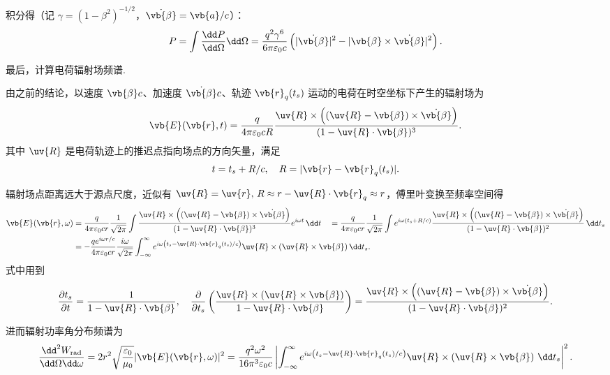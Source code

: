 积分得（记 \(\gamma = (1 - \beta^2)^{-1/2}\)，\(\dot{\vb{\beta}} = \vb{a}/c\)）：
\begin{align*}
	P = \int \dfrac{\dd P}{\dd \Omega} \dd \Omega = \dfrac{q^2 \gamma^6}{6\pi \varepsilon_0 c} \left( |\dot{\vb{\beta}}|^2 - |\vb{\beta} \times \dot{\vb{\beta}}|^2 \right).
\end{align*}

最后，计算电荷辐射场频谱.

由之前的结论，以速度 \(\vb{\beta}c\)、加速度 \(\dot{\vb{\beta}}c\)、轨迹 \(\vb{r}_{q}(t_{s})\) 运动的电荷在时空坐标下产生的辐射场为
\begin{align*}
	\vb{E}(\vb{r}, t) = \frac{q}{4\pi \varepsilon_{0} c R} \frac{\uv{R} \times \left( (\uv{R} - \vb{\beta}) \times \dot{\vb{\beta}} \right)}{(1 - \uv{R} \cdot \vb{\beta})^{3}}.
\end{align*}
其中 \(\uv{R}\) 是电荷轨迹上的推迟点指向场点的方向矢量，满足
\begin{align*}
	t = t_{s} + R/c, \quad R = |\vb{r} - \vb{r}_{q}(t_{s})|.
\end{align*}

辐射场点距离远大于源点尺度，近似有 \(\uv{R}=\uv{r},\,R \approx r - \uv{R} \cdot \vb{r}_{q} \approx r\)，傅里叶变换至频率空间得
\begin{align*}
	\vb{E}(\vb{r}, \omega) &= \frac{q}{4\pi \varepsilon_{0} c r} \frac{1}{\sqrt{2\pi}} \int \frac{\uv{R} \times \left( (\uv{R} - \vb{\beta}) \times \dot{\vb{\beta}} \right)}{(1 - \uv{R} \cdot \vb{\beta})^{3}} e^{i\omega t} \, \dd t \quad= \frac{q}{4\pi \varepsilon_{0} c r} \frac{1}{\sqrt{2\pi}} \int e^{i\omega (t_{s} + R/c)} \frac{\uv{R} \times \left( (\uv{R} - \vb{\beta}) \times \dot{\vb{\beta}} \right)}{(1 - \uv{R} \cdot \vb{\beta})^{2}} \, \dd t_{s} \\
	&= -\frac{q e^{i\omega r/c}}{4\pi \varepsilon_{0} c r} \frac{i\omega}{\sqrt{2\pi}} \int_{-\infty}^{\infty} e^{i\omega \left( t_{s} - \uv{R} \cdot \vb{r}_{q}(t_{s})/c \right)} \uv{R} \times (\uv{R} \times \vb{\beta}) \, \dd t_{s}.
\end{align*}
式中用到
\begin{align*}
	\frac{\partial t_{s}}{\partial t} = \frac{1}{1 - \uv{R} \cdot \vb{\beta}}, \quad \frac{\partial}{\partial t_{s}} \left( \frac{\uv{R} \times (\uv{R} \times \vb{\beta})}{1 - \uv{R} \cdot \vb{\beta}} \right) = \frac{\uv{R} \times \left( (\uv{R} - \vb{\beta}) \times \dot{\vb{\beta}} \right)}{(1 - \uv{R} \cdot \vb{\beta})^{2}}.
\end{align*}

进而辐射功率角分布频谱为
\begin{align*}
	\frac{\dd^{2} W_{\mathrm{rad}}}{\dd \Omega \dd \omega} = 2 r^{2} \sqrt{\frac{\varepsilon_{0}}{\mu_{0}}} | \vb{E}(\vb{r}, \omega) |^{2} = \frac{q^{2} \omega^{2}}{16\pi^{3} \varepsilon_{0} c} \left| \int_{-\infty}^{\infty} e^{i\omega \left( t_{s} - \uv{R} \cdot \vb{r}_{q}(t_{s})/c \right)} \uv{R} \times \left( \uv{R} \times \vb{\beta} \right) \, \dd t_{s} \right|^{2}.
\end{align*}

